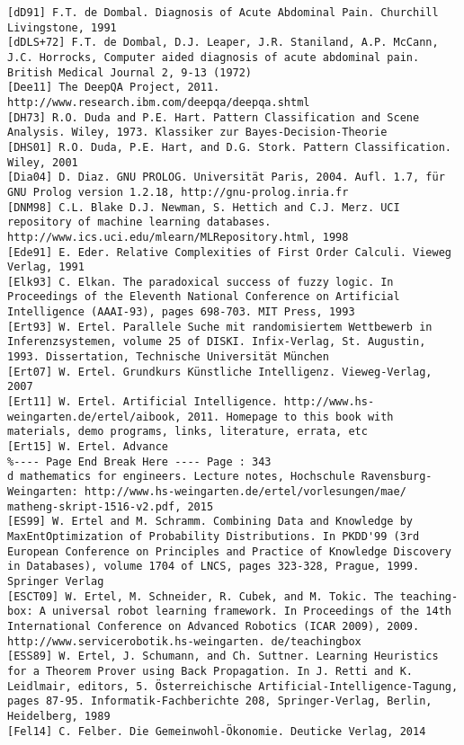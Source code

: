 \documentclass[10pt]{article}
\begin{document}
\begin{verbatim}
[dD91] F.T. de Dombal. Diagnosis of Acute Abdominal Pain. Churchill Livingstone, 1991
[dDLS+72] F.T. de Dombal, D.J. Leaper, J.R. Staniland, A.P. McCann, J.C. Horrocks, Computer aided diagnosis of acute abdominal pain. British Medical Journal 2, 9-13 (1972)
[Dee11] The DeepQA Project, 2011. http://www.research.ibm.com/deepqa/deepqa.shtml
[DH73] R.O. Duda and P.E. Hart. Pattern Classification and Scene Analysis. Wiley, 1973. Klassiker zur Bayes-Decision-Theorie
[DHS01] R.O. Duda, P.E. Hart, and D.G. Stork. Pattern Classification. Wiley, 2001
[Dia04] D. Diaz. GNU PROLOG. Universität Paris, 2004. Aufl. 1.7, für GNU Prolog version 1.2.18, http://gnu-prolog.inria.fr
[DNM98] C.L. Blake D.J. Newman, S. Hettich and C.J. Merz. UCI repository of machine learning databases. http://www.ics.uci.edu/mlearn/MLRepository.html, 1998
[Ede91] E. Eder. Relative Complexities of First Order Calculi. Vieweg Verlag, 1991
[Elk93] C. Elkan. The paradoxical success of fuzzy logic. In Proceedings of the Eleventh National Conference on Artificial Intelligence (AAAI-93), pages 698-703. MIT Press, 1993
[Ert93] W. Ertel. Parallele Suche mit randomisiertem Wettbewerb in Inferenzsystemen, volume 25 of DISKI. Infix-Verlag, St. Augustin, 1993. Dissertation, Technische Universität München
[Ert07] W. Ertel. Grundkurs Künstliche Intelligenz. Vieweg-Verlag, 2007
[Ert11] W. Ertel. Artificial Intelligence. http://www.hs-weingarten.de/ertel/aibook, 2011. Homepage to this book with materials, demo programs, links, literature, errata, etc
[Ert15] W. Ertel. Advance
%---- Page End Break Here ---- Page : 343
d mathematics for engineers. Lecture notes, Hochschule Ravensburg-Weingarten: http://www.hs-weingarten.de/ertel/vorlesungen/mae/ matheng-skript-1516-v2.pdf, 2015
[ES99] W. Ertel and M. Schramm. Combining Data and Knowledge by MaxEntOptimization of Probability Distributions. In PKDD'99 (3rd European Conference on Principles and Practice of Knowledge Discovery in Databases), volume 1704 of LNCS, pages 323-328, Prague, 1999. Springer Verlag
[ESCT09] W. Ertel, M. Schneider, R. Cubek, and M. Tokic. The teaching-box: A universal robot learning framework. In Proceedings of the 14th International Conference on Advanced Robotics (ICAR 2009), 2009. http://www.servicerobotik.hs-weingarten. de/teachingbox
[ESS89] W. Ertel, J. Schumann, and Ch. Suttner. Learning Heuristics for a Theorem Prover using Back Propagation. In J. Retti and K. Leidlmair, editors, 5. Österreichische Artificial-Intelligence-Tagung, pages 87-95. Informatik-Fachberichte 208, Springer-Verlag, Berlin, Heidelberg, 1989
[Fel14] C. Felber. Die Gemeinwohl-Ökonomie. Deuticke Verlag, 2014

\end{verbatim}
\end{document}
